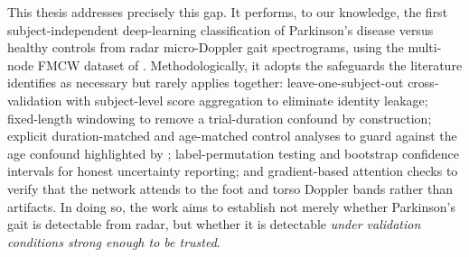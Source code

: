 This thesis addresses precisely this gap. It performs, to our knowledge, the
first subject-independent deep-learning classification of Parkinson's disease
versus healthy controls from radar micro-Doppler gait spectrograms, using the
multi-node FMCW dataset of \cite{lopezdelgado2026}. Methodologically, it adopts
the safeguards the literature identifies as necessary but rarely applies
together: leave-one-subject-out cross-validation with subject-level score
aggregation to eliminate identity leakage; fixed-length windowing to remove a
trial-duration confound by construction; explicit duration-matched and
age-matched control analyses to guard against the age confound highlighted by
\cite{hayashi2021}; label-permutation testing and bootstrap confidence intervals
for honest uncertainty reporting; and gradient-based attention checks to verify
that the network attends to the foot and torso Doppler bands rather than
artifacts. In doing so, the work aims to establish not merely whether Parkinson's
gait is detectable from radar, but whether it is detectable \emph{under
validation conditions strong enough to be trusted}.
